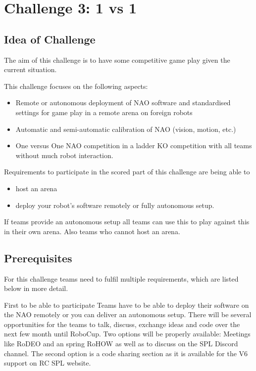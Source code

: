 \section{Challenge 3: 1 vs 1}

\subsection{Idea of Challenge}
The aim of this challenge is to have some competitive game play given the current situation.   

This challenge focuses on the following aspects:
\begin{itemize}
    \item Remote or autonomous deployment of NAO software and standardised settings for game play in a remote arena on foreign robots
    \item Automatic and semi-automatic calibration of NAO (vision, motion, etc.) 
    \item One versus One NAO competition in a ladder KO competition with all teams without much robot interaction. 
\end{itemize}

Requirements to participate in the scored part of this challenge are being able to
\begin{itemize}
    \item host an arena
    \item deploy your robot's software remotely or fully autonomous setup. 
\end{itemize}

If teams provide an autonomous setup all teams can use this to play against this in their own arena. Also teams who cannot host an arena.

\subsection{Prerequisites}
For this challenge teams need to fulfil multiple requirements, which are listed below in more detail.

First to be able to participate Teams have to  be able to deploy their software on the NAO remotely or you can deliver an autonomous setup. There will be several opportunities for the teams to talk, discuss, exchange ideas and code over the next few month until RoboCup. Two options will be properly available: Meetings like RoDEO and an spring RoHOW as well as to discuss on the SPL Discord channel. The second option is a code sharing section as it is available for the V6 support on RC SPL website.  

